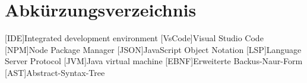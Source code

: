 \chapter*{Abkürzungsverzeichnis}

\begin{acronym}[LoRaWAN]

[IDE]{Integrated development environment}
[VsCode]{Visual Studio Code}
[NPM]{Node Package Manager}
[JSON]{JavaScript Object Notation}
[LSP]{Language Server Protocol}
[JVM]{Java virtual machine}
[EBNF]{Erweiterte Backus-Naur-Form}
[AST]{Abstract-Syntax-Tree}


\end{acronym}
